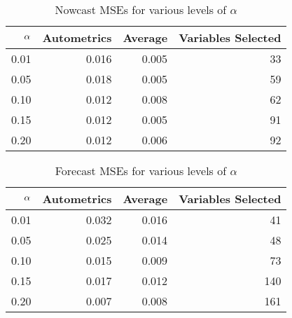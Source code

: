 \begin{table}[h]
\centering

\begin{tabular}{r|r|r|r}
   $\bf{\alpha}$    & \textbf{Autometrics} & \textbf{Average} & \textbf{Variables Selected} \\
  \hline
0.01 &     0.016                                &     0.005           &          33                   \\
0.05 &      0.018                        &     0.005             & 59\\
0.10 &      0.012                                  &    0.008         &62       \\
0.15 &    0.012                                     &     0.005       &   91 \\
0.20&        0.012                              &          0.006     &        92                    
\end{tabular}
\caption{Nowcast MSEs for various levels of $\alpha$}
\label{tab:MSENowcastsdiffalpha}
\end{table}

\begin{table}[h]
\centering

\begin{tabular}{r|r|r|r}
   $\bf{\alpha}$    & \textbf{Autometrics} & \textbf{Average} &\textbf{Variables Selected} \\
  \hline
0.01 &  0.032                         &                0.016            &      41          \\
0.05 &  0.025                         &             0.014     & 48\\
0.10 &     0.015                	    &          0.009         & 73\\
0.15 &   0.017                        &         0.012     & 140\\
0.20 &     0.007      		 &            0.008       &     161                      
\end{tabular}
\caption{Forecast MSEs for various levels of $\alpha$}
\label{tab:MSEForecastdiffalpha}
\end{table}




